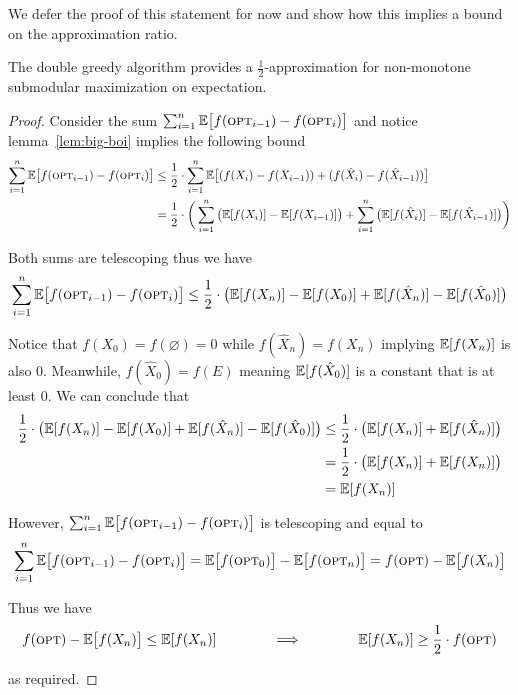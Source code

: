 \documentclass{article}
\begin{document}
We defer the proof of this statement for now and show how this implies a bound on the approximation ratio.
\begin{theorem}
The double greedy algorithm provides a $\frac{1}{2}$-approximation for non-monotone submodular maximization on expectation.
\end{theorem}
\begin{proof}
Consider the sum $\sum_{i=1}^n \mathbb{E} \big[ f(\textup{\textsc{opt}}_{i-1}) - f(\textup{\textsc{opt}}_i) \big]$ and notice lemma~\ref{lem:big-boi} implies the following bound
\begin{align*}
\sum_{i=1}^n \mathbb{E} \big[ f(\textup{\textsc{opt}}_{i-1}) - f(\textup{\textsc{opt}}_i) \big]
&\leq \frac{1}{2} \cdot \sum_{i=1}^n \mathbb{E} \big[ (f(X_i) - f(X_{i-1})) + (f(\hat{X}_i) - f(\hat{X}_{i-1})) \big] \\
&= \frac{1}{2} \cdot \bigg( \sum_{i=1}^n \big( \mathbb{E}[ f(X_i) ] - \mathbb{E}[ f(X_{i-1}) ] \big) + \sum_{i=1}^n \big( \mathbb{E}[ f(\hat{X}_i) ] - \mathbb{E}[ f(\hat{X}_{i-1}) ] \big) \bigg)
\end{align*}

Both sums are telescoping thus we have
\begin{equation*}
\sum_{i=1}^n \mathbb{E} \big[ f(\textup{\textsc{opt}}_{i-1}) - f(\textup{\textsc{opt}}_i) \big]
\leq \frac{1}{2} \cdot \big( \mathbb{E}[ f(X_n) ] - \mathbb{E}[ f(X_0) ] + \mathbb{E}[ f(\hat{X}_n) ] - \mathbb{E}[ f(\hat{X}_0) ] \big)
\end{equation*}

Notice that $f(X_0) = f(\varnothing) = 0$ while $f(\hat{X}_n) = f(X_n)$ implying $\mathbb{E}[ f(X_n) ]$ is also 0. Meanwhile, $f(\hat{X}_0) = f(E)$ meaning $\mathbb{E}[ f(\hat{X}_0) ]$ is a constant that is at least 0. We can conclude that
\begin{align*}
\frac{1}{2} \cdot \big( \mathbb{E}[ f(X_n) ] - \mathbb{E}[ f(X_0) ] + \mathbb{E}[ f(\hat{X}_n) ] - \mathbb{E}[ f(\hat{X}_0) ] \big)
&\leq \frac{1}{2} \cdot \big( \mathbb{E}[ f(X_n) ] + \mathbb{E}[ f(\hat{X}_n) ] \big) \\
&= \frac{1}{2} \cdot \big( \mathbb{E}[ f(X_n) ] + \mathbb{E}[ f(X_n) ] \big) \\
&= \mathbb{E}[ f(X_n) ]
\end{align*}

However, $\sum_{i=1}^n \mathbb{E} \big[ f(\textup{\textsc{opt}}_{i-1}) - f(\textup{\textsc{opt}}_i) \big]$ is telescoping and equal to
\begin{equation*}
\sum_{i=1}^n \mathbb{E} \big[ f(\textup{\textsc{opt}}_{i-1}) - f(\textup{\textsc{opt}}_i) \big]
= \mathbb{E} \big[ f(\textup{\textsc{opt}}_0) \big] - \mathbb{E} \big[ f(\textup{\textsc{opt}}_n) \big]
= f(\textup{\textsc{opt}}) - \mathbb{E} \big[ f(X_n) \big]
\end{equation*}

Thus we have
\begin{equation*}
f(\textup{\textsc{opt}}) - \mathbb{E} \big[ f(X_n) \big]
\leq \mathbb{E}[ f(X_n) ]
\qquad\qquad\Longrightarrow\qquad\qquad
\mathbb{E}[ f(X_n) ] \geq \frac{1}{2} \cdot f(\textup{\textsc{opt}})
\end{equation*}

as required.
\end{proof}
\end{document}
